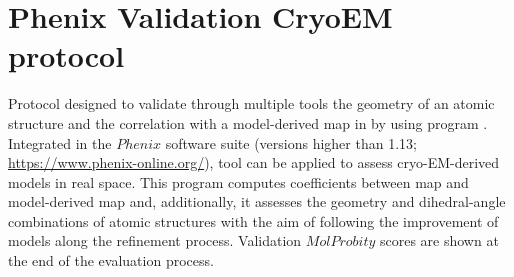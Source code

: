 \section{Phenix Validation CryoEM protocol}
\label{app:valCryoEMProtocol}%

Protocol designed to validate through multiple tools the geometry of an atomic structure and the correlation with a model-derived map in \scipion by using  program \citep{afonine2018b}. Integrated in the $Phenix$ software suite (versions higher than 1.13; \url{https://www.phenix-online.org/}),  tool can be applied to assess cryo-EM-derived models in real space. This program computes  coefficients between map and model-derived map and, additionally, it assesses the geometry and dihedral-angle combinations of atomic structures with the aim of following the improvement of models along the refinement process. Validation $MolProbity$ scores are shown at the end of the evaluation process.

